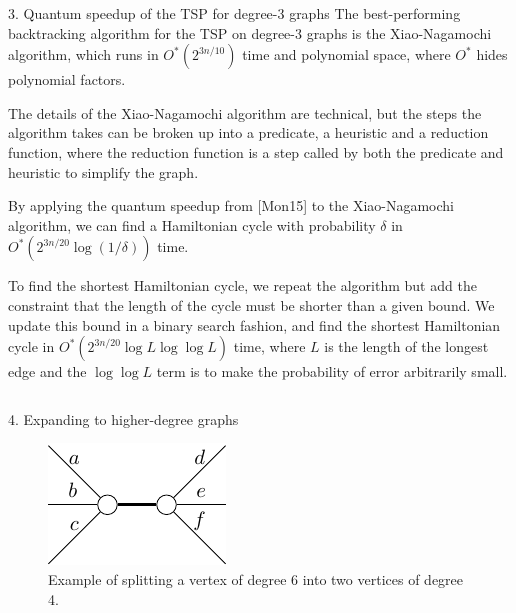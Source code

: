 \documentclass[]{templates/poster}
\begin{document}
\begin{frame}{}
\begin{columns}[t]
\begin{column}{0.422\linewidth}
\begin{block}{\Large 3. Quantum speedup of the TSP for degree-3 graphs}
  The best-performing backtracking algorithm for the TSP on degree-3 graphs is the Xiao-Nagamochi algorithm, which runs in $O^*(2^{3n/10})$ time and polynomial space, where $O^*$ hides polynomial factors.
  
  The details of the Xiao-Nagamochi algorithm are technical, but the steps the algorithm takes can be broken up into a predicate, a heuristic and a reduction function, where the reduction function is a step called by both the predicate and heuristic to simplify the graph.

  By applying the quantum speedup from [Mon15] to the Xiao-Nagamochi algorithm, we can find a Hamiltonian cycle with probability $\delta$ in $O^*(2^{3n/20}\log(1/\delta))$ time.
  
  To find the shortest Hamiltonian cycle, we repeat the algorithm but add the constraint that the length of the cycle must be shorter than a given bound. We update this bound in a binary search fashion, and find the shortest Hamiltonian cycle in $O^*(2^{3n/20}\log L\log\log L)$ time, where $L$ is the length of the longest edge and the $\log\log L$ term is to make the probability of error arbitrarily small.
  \end{block}
  \end{column}
\end{columns}
  
  \begin{columns}[t]
  \begin{column}{0.422\linewidth}

  \begin{block}{\Large 4. Expanding to higher-degree graphs}
  \begin{figure}
  \begin{framed}\raggedleft
  \includegraphics[width=\linewidth]{deg5}
  \caption{Example of splitting a vertex of degree 6 into two vertices of degree 4.}
  \end{framed}
  \end{figure}


\end{block}
\end{column}
\end{columns}
\end{frame}
\end{document}
